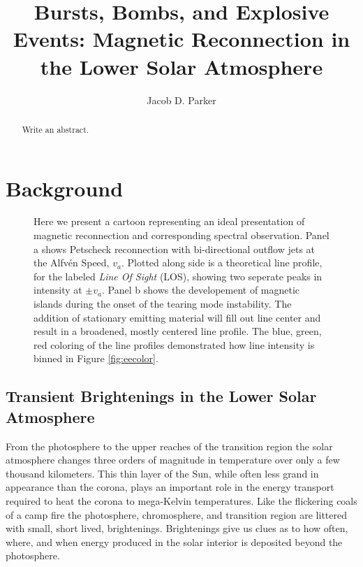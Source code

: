 \documentclass[]{aastex6}
\begin{document}
\title{Bursts, Bombs, and Explosive Events: Magnetic Reconnection in the Lower Solar Atmosphere} 

\author{Jacob D. Parker}





\begin{abstract}
	Write an abstract.

\end{abstract}

\section{Background}

	\begin{figure}
		\label{fig:reconnect}
		\caption{Here we present a cartoon representing an ideal presentation of magnetic reconnection and corresponding spectral observation.  Panel a shows Petscheck reconnection with bi-directional outflow jets at the Alfv\'en Speed, $v_a$.  Plotted along side is a theoretical line profile, for the labeled \textit{Line Of Sight} (LOS), showing two seperate peaks in intensity at $\pm v_a$. Panel b shows the developement of magnetic islands during the onset of the tearing mode instability.  The addition of stationary emitting material will fill out line center and result in a broadened, mostly centered line profile. The blue, green, red coloring of the line profiles demonstrated how line intensity is binned in Figure \ref{fig:eecolor}.}
		
		\centerline{} 
		
	\end{figure}  
	\subsection{Transient Brightenings in the Lower Solar Atmosphere}
	
	
	From the photosphere to the upper reaches of the transition region the solar atmosphere changes three orders of magnitude in temperature over only a few thousand kilometers.  This thin layer of the Sun, while often less grand in appearance than the corona, plays an important role in the energy transport required to heat the corona to mega-Kelvin temperatures.  Like the flickering coals of a camp fire the photosphere, chromosphere, and transition region are littered with small, short lived, brightenings.  Brightenings give us clues as to how often, where, and when energy produced in the solar interior is deposited beyond the photosphere.
	
\end{document}
